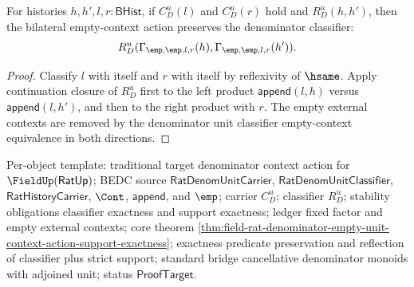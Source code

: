 
\begin{theorem}
\label{thm:rat-denom-unit-contextual-action-empty-context-hsame-transport}
For histories $h,h',l,r:\mathsf{BHist}$, if $C_D^u(l)$ and $C_D^u(r)$ hold
and $R_D^u(h,h')$, then the bilateral empty-context action preserves the
denominator classifier:
$$
R_D^u(\Gamma_{\emp,\emp,l,r}(h),\Gamma_{\emp,\emp,l,r}(h')).
$$
\end{theorem}
\begin{proof}
Classify $l$ with itself and $r$ with itself by reflexivity of $\hsame$.
Apply continuation closure of $R_D^u$ first to the left product
$\mathsf{append}(l,h)$ versus $\mathsf{append}(l,h')$, and then to the right
product with $r$. The empty external contexts are removed by the denominator
unit classifier empty-context equivalence in both directions.
\end{proof}

Per-object template: traditional target denominator context action for
$\FieldUp(\mathsf{RatUp})$; BEDC source $\mathsf{RatDenomUnitCarrier}$,
$\mathsf{RatDenomUnitClassifier}$, $\mathsf{RatHistoryCarrier}$, $\Cont$,
$\mathsf{append}$, and $\emp$; carrier $C_D^u$; classifier $R_D^u$; stability
obligations classifier exactness and support exactness; ledger fixed factor and
empty external contexts; core theorem
\autoref{thm:field-rat-denominator-empty-unit-context-action-support-exactness};
exactness predicate preservation and reflection of classifier plus strict
support; standard bridge cancellative denominator monoids with adjoined unit;
status $\mathsf{ProofTarget}$.

